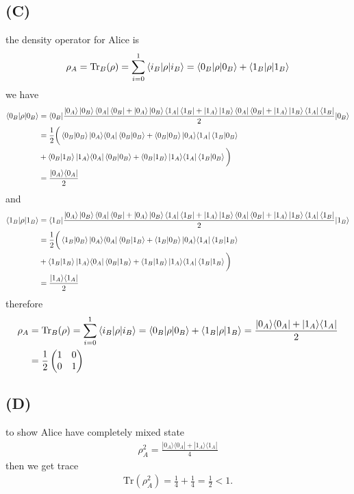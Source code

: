 \documentclass{article}
\newcommand{\op}[2]{|#1\rangle \langle#2|}
\newcommand{\sand}[3]{\braket{#1 | #2 | #3}}
\begin{document}
\subsection*{(C)}
the density operator for Alice is
 \begin{align*}
    \rho_{A} = \text{Tr}_B(\rho) = \sum_{i=0}^{1} \sand{i_B}{\rho}{i_B} = \sand{0_B}{\rho}{0_B} + \sand{1_B}{\rho}{1_B} 
 \end{align*}
 we have
 \begin{align*}
    \sand{0_B}{\rho}{0_B} &= \sand{0_B}{\frac{\ket{0_A}\ket{0_B}\bra{0_A}\bra{0_B} + \ket{0_A}\ket{0_B}\bra{1_A}\bra{1_B} + \ket{1_A}\ket{1_B}\bra{0_A}\bra{0_B} + \ket{1_A}\ket{1_B}\bra{1_A}\bra{1_B}}{2}}{0_B} \\
    &= \frac{1}{2}\bigg(\braket{0_B|0_B}\op{0_A}{0_A}\braket{0_B|0_B} + \braket{0_B|0_B}\op{0_A}{1_A}\braket{1_B|0_B} \\
    &+ \braket{0_B|1_B}\op{1_A}{0_A}\braket{0_B|0_B} + \braket{0_B|1_B}\op{1_A}{1_A}\braket{1_B|0_B}\bigg) \\
    &= \frac{\op{0_A}{0_A}}{2}
 \end{align*}
 and
 \begin{align*}
    \sand{1_B}{\rho}{1_B} &= \sand{1_B}{\frac{\ket{0_A}\ket{0_B}\bra{0_A}\bra{0_B} + \ket{0_A}\ket{0_B}\bra{1_A}\bra{1_B} + \ket{1_A}\ket{1_B}\bra{0_A}\bra{0_B} + \ket{1_A}\ket{1_B}\bra{1_A}\bra{1_B}}{2}}{1_B} \\
    &= \frac{1}{2}\bigg(\braket{1_B|0_B}\op{0_A}{0_A}\braket{0_B|1_B} + \braket{1_B|0_B}\op{0_A}{1_A}\braket{1_B|1_B} \\
    &+ \braket{1_B|1_B}\op{1_A}{0_A}\braket{0_B|1_B} + \braket{1_B|1_B}\op{1_A}{1_A}\braket{1_B|1_B}\bigg) \\
    &= \frac{\op{1_A}{1_A}}{2}
 \end{align*}
 therefore
 \begin{align*}
    \rho_{A} &= \text{Tr}_B(\rho) = \sum_{i=0}^{1} \sand{i_B}{\rho}{i_B} = \sand{0_B}{\rho}{0_B} + \sand{1_B}{\rho}{1_B} = \frac{\op{0_A}{0_A}+\op{1_A}{1_A}}{2} \\
    &= \frac{1}{2}\begin{pmatrix}1&0\\0&1\end{pmatrix}
 \end{align*}
 \subsection*{(D)}
 to show Alice have completely mixed state
 \begin{align*}
    \rho_{A}^2 = \frac{\op{0_A}{0_A}+\op{1_A}{1_A}}{4}
 \end{align*}
 then we get trace
 \begin{align*}
    \text{Tr}(\rho_{A}^2)= \frac{1}{4} + \frac{1}{4} = \frac{1}{2} < 1.
 \end{align*}
\end{document}
